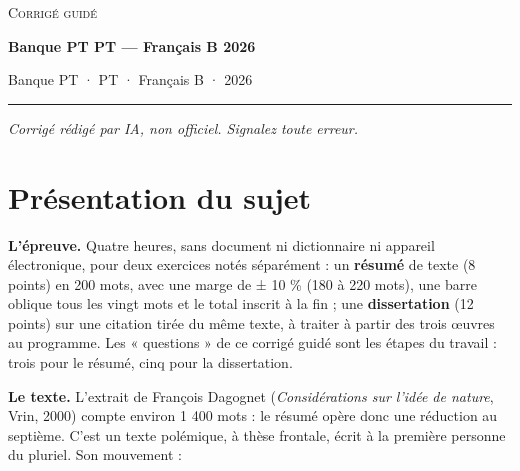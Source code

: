 \documentclass[11pt,a4paper]{article}
\begin{document}
\thispagestyle{plain}
\begin{center}
  {\small\scshape Corrigé guidé}\par\smallskip
  {\LARGE\bfseries Banque PT PT — Français B 2026\par}\medskip
  {\large Banque PT · PT · Français B · 2026\par}
\end{center}
\vspace{2pt}\hrule\vspace{8pt}

\emph{Corrigé rédigé par IA, non officiel. Signalez toute erreur.}

\hypertarget{pruxe9sentation-du-sujet}{%
\section{Présentation du sujet}\label{pruxe9sentation-du-sujet}}

\textbf{L'épreuve.} Quatre heures, sans document ni dictionnaire ni appareil électronique, pour deux exercices notés séparément : un \textbf{résumé} de texte (8 points) en 200 mots, avec une marge de ± 10 \% (180 à 220 mots), une barre oblique tous les vingt mots et le total inscrit à la fin ; une \textbf{dissertation} (12 points) sur une citation tirée du même texte, à traiter à partir des trois œuvres au programme. Les « questions » de ce corrigé guidé sont les étapes du travail : trois pour le résumé, cinq pour la dissertation.

\textbf{Le texte.} L'extrait de François Dagognet (\emph{Considérations sur l'idée de nature}, Vrin, 2000) compte environ 1 400 mots : le résumé opère donc une réduction au septième. C'est un texte polémique, à thèse frontale, écrit à la première personne du pluriel. Son mouvement :
\end{document}
